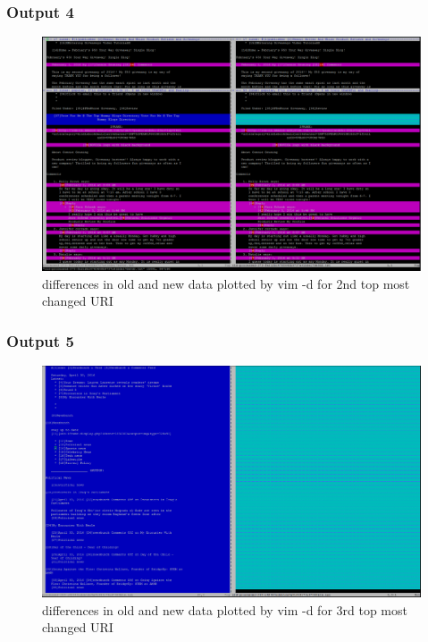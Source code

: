 \subsubsection{Output 4}
\begin{figure}[ht]    
    \begin{center}
        \includegraphics[scale=0.4]{output373.png}
        \caption{differences in old and new data plotted by vim -d for 2nd top most changed URI }
        \label{Samplet44}
    \end{center}
\end{figure}
\newpage


\subsubsection{Output 5}
\begin{figure}[ht]    
    \begin{center}
        \includegraphics[scale=0.4]{output249.png}
        \caption{differences in old and new data plotted by vim -d for 3rd top most changed URI}
        \label{Samplet45}
    \end{center}
\end{figure}
\newpage




